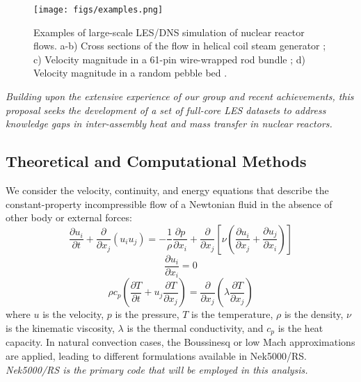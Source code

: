 \begin{figure}[!ht]
\centering
\texttt{[image: figs/examples.png]}
\caption{Examples of large-scale LES/DNS simulation of nuclear reactor flows.
a-b) Cross sections of the flow in helical coil steam generator
\cite{alper2018}; c) Velocity magnitude in a 61-pin wire-wrapped rod bundle
\cite{goth2018comparison}; d) Velocity magnitude in a random pebble bed
\cite{yuan2019}.} \label{f:examples}
\end{figure}


\begin{displayquote}
\textit{
Building upon the extensive experience of our group and recent achievements, this proposal seeks the development of a set of full-core LES
datasets to address knowledge gaps in inter-assembly heat and mass
transfer in nuclear reactors.
}
\end{displayquote}

\vspace{-.25in}
\subsection{Theoretical and Computational Methods}
\vspace{-.2in}

We consider the velocity, continuity, and energy equations that
describe the constant-property incompressible flow of a Newtonian fluid in the
absence of other body or external forces:
\begin{equation}
\frac{\partial  u_i  }{\partial t} +  \frac{\partial}{\partial x_j} \left( u_i u_j \right) =-\frac{1}{\rho} \frac{\partial p}{\partial x_i} + \frac{\partial}{\partial x_j} \left[ \nu \left( \frac{\partial u_i}{\partial x_j} +\frac{\partial u_j}{\partial x_i} \right) \right]
\label{eq:UEqn}
\end{equation}
\begin{equation}
\frac{\partial u_i}{\partial x_i} = 0
\label{eq:rhoEqn}
\end{equation}
\begin{equation}
\rho c_p \left( \frac{\partial T }{\partial t} + u_j \frac{\partial T}{\partial x_j} \right) = \frac{\partial }{\partial x_j} \left( \lambda \frac{\partial T}{\partial x_j} \right)
\label{eq:EEqn}
\end{equation}
where $u$ is the velocity, $p$ is the pressure, $T$ is the temperature, $\rho$
is the  density, $\nu$ is the kinematic viscosity, $\lambda$ is
the thermal conductivity, and $c_p$ is the heat capacity. In natural
convection cases, the Boussinesq or low Mach approximations
\cite{tomboulides1997numerical} are applied, leading to different
formulations available in Nek5000/RS.
{\it Nek5000/RS is the primary code that will be employed
in this analysis.}


